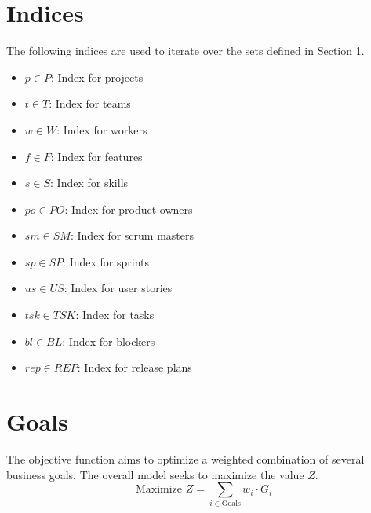 \documentclass{article}
\begin{document}
\section{Indices}
The following indices are used to iterate over the sets defined in Section 1.
\begin{itemize}
    \item $p \in P$: Index for projects
    \item $t \in T$: Index for teams
    \item $w \in W$: Index for workers
    \item $f \in F$: Index for features
    \item $s \in S$: Index for skills
    \item $po \in PO$: Index for product owners
    \item $sm \in SM$: Index for scrum masters
    \item $sp \in SP$: Index for sprints
    \item $us \in US$: Index for user stories
    \item $tsk \in TSK$: Index for tasks
    \item $bl \in BL$: Index for blockers
    \item $rep \in REP$: Index for release plans
\end{itemize}

\section{Goals}
The objective function aims to optimize a weighted combination of several business goals. The overall model seeks to maximize the value $Z$.
\begin{equation*}
    \text{Maximize } Z = \sum_{i \in \text{Goals}} w_i \cdot G_i
\end{equation*}
\end{document}
